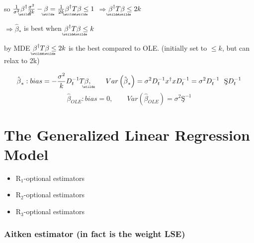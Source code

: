 \documentclass{article}
\begin{document}
so $\frac{1}{\sigma ^{2}}%
\underaccent{\wtilde}{\beta}%
^{\dagger }\frac{\sigma ^{2}}{2k}-%
\underaccent{\wtilde}{\beta}%
=\frac{1}{2k}%
\underaccent{\wtilde}{\beta}%
^{\dagger }T%
\underaccent{\wtilde}{\beta}%
\leq 1$ $\Rightarrow $\underline{$%
\underaccent{\wtilde}{\beta}%
^{\dagger }T%
\underaccent{\wtilde}{\beta}%
\leq 2k$}

$\Rightarrow \hat{\beta}_{\ast }$ is best when $%
\underaccent{\wtilde}{\beta}%
^{\dagger }T%
\underaccent{\wtilde}{\beta}%
\leq k$

by MDE $%
\underaccent{\wtilde}{\beta}%
^{\dagger }T%
\underaccent{\wtilde}{\beta}%
\leq 2k$ is the best compared to OLE. (initially set to $\leq k$, but can
relax to 2k)

\bigskip 

\begin{equation*}
\hat{\beta}_{\ast }:bias=-\frac{\sigma ^{2}}{k}D_{t}^{-1}T%
\underaccent{\wtilde}{\beta}%
,\qquad Var\left( \hat{\beta}_{\ast }\right) =\sigma
^{2}D_{t}^{-1}x^{\dagger }xD_{t}^{-1}=\sigma ^{2}D_{t}^{-1}\text{\c{S}}%
D_{t}^{-1}
\end{equation*}%
\begin{equation*}
\hat{\beta}_{OLE}:bias=0,\qquad Var\left( \hat{\beta}_{OLE}\right) =\sigma
^{2}\text{\c{S}}^{-1}
\end{equation*}

\bigskip

\part{The Generalized Linear Regression Model}

\bigskip

\begin{itemize}
\item R$_{1}$-optional estimators

\item R$_{2}$-optional estimators

\item R$_{3}$-optional estimators
\end{itemize}

\section{Aitken estimator (in fact is the weight LSE)}
\end{document}
